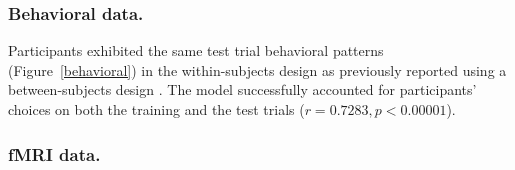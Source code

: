 \documentclass[10pt,letterpaper]{article}
\begin{document}
\subsubsection{Behavioral data.}

Participants exhibited the same test trial behavioral patterns (Figure~\ref{behavioral}) in the within-subjects design as previously reported using a between-subjects design \cite{Gershman2017}. The model successfully accounted for participants' choices on both the training and the test trials ($r = 0.7283, p < 0.00001$).

\subsubsection{fMRI data.} 



\end{document}
